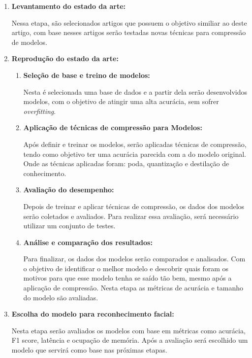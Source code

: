 \begin{enumerate}
	\item \textbf{Levantamento do estado da arte:}

		Nessa etapa, são selecionados artigos que possuem o objetivo similiar ao deste artigo,
		com base nesses artigos serão testadas novas técnicas para compressão de modelos.

	\item \textbf{Reprodução do estado da arte:}

	\begin{enumerate}
		\item \textbf{Seleção de base e treino de modelos:}

			Nesta é selecionada uma base de dados e a partir dela serão desenvolvidos modelos,
			com o objetivo de atingir uma alta acurácia, sem sofrer \textit{overfitting}.

		\item \textbf{Aplicação de técnicas de compressão para Modelos:}

			Após definir e treinar os modelos, serão aplicadas técnicas de compressão, tendo como
			objetivo ter uma acurácia parecida com a do modelo original. Onde as técnicas aplicadas
			foram: poda, quantização e destilação de conhecimento.

		\item \textbf{Avaliação do desempenho:}

			Depois de treinar e aplicar técnicas de compressão, os dados dos modelos serão coletados e
			avaliados. Para realizar essa avaliação, será necessário utilizar um conjunto de testes.

		\item \textbf{Análise e comparação dos resultados:}

			Para finalizar, os dados dos modelos serão comparados e analisados. Com o objetivo de
			identificar o melhor modelo e descobrir quais foram os motivos para que esse modelo tenha se
			saído tão bem, mesmo após a aplicação de compressão. Nesta etapa as métricas de acurácia e
			tamanho do modelo são avaliadas.
	\end{enumerate}

	\item \textbf{Escolha do modelo para reconhecimento facial:}

		Nesta etapa serão avaliados os modelos com base em métricas como acurácia, F1 score, latência e ocupação de
		memória. Após a avaliação será escolhido um modelo que servirá como base nas próximas etapas.


\end{enumerate}
